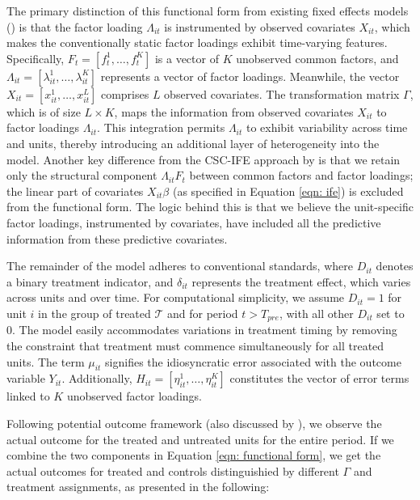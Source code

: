 \documentclass[12pt]{article}
\begin{document}
The primary distinction of this functional form from existing fixed effects models (\cite{gobillon2016regional, chan2016policy}) is that the factor loading $\Lambda_{it}$ is instrumented by observed covariates $X_{it}$, which makes the conventionally static factor loadings exhibit time-varying features. Specifically, $F_t = [f_t^1, \ldots, f_t^K]$ is a vector of $K$ unobserved common factors, and $\Lambda_{it} = [\lambda_{it}^1, \ldots, \lambda_{it}^K]$ represents a vector of factor loadings. Meanwhile, the vector $X_{it} = [x_{it}^1, \ldots, x_{it}^L]$ comprises $L$ observed covariates. The transformation matrix $\Gamma$, which is of size $L \times K$, maps the information from observed covariates $X_{it}$ to factor loadings $\Lambda_{it}$. This integration permits $\Lambda_{it}$ to exhibit variability across time and units, thereby introducing an additional layer of heterogeneity into the model. Another key difference from the CSC-IFE approach by \cite{xu2017generalized} is that we retain only the structural component $\Lambda_{it} F_t$ between common factors and factor loadings; the linear part of covariates $X_{it}\beta$ (as specified in Equation \ref{eqn: ife}) is excluded from the functional form. The logic behind this is that we believe the unit-specific factor loadings, instrumented by covariates, have included all the predictive information from these predictive covariates.

The remainder of the model adheres to conventional standards, where $D_{it}$ denotes a binary treatment indicator, and $\delta_{it}$ represents the treatment effect, which varies across units and over time. For computational simplicity, we assume $D_{it} = 1$ for unit $i$ in the group of treated $\mathcal{T}$ and for period $t > T_{pre}$, with all other $D_{it}$ set to $0$. The model easily accommodates variations in treatment timing by removing the constraint that treatment must commence simultaneously for all treated units. The term $\mu_{it}$ signifies the idiosyncratic error associated with the outcome variable $Y_{it}$. Additionally, $H_{it} = [\eta_{it}^1, \ldots, \eta_{it}^K]$ constitutes the vector of error terms linked to $K$ unobserved factor loadings.


Following \cite{splawa1990application} potential outcome framework (also discussed by \cite{rubin1974estimating, rubin2005causal}), we observe the actual outcome for the treated and untreated units for the entire period. If we combine the two components in Equation \ref{eqn: functional form}, we get the actual outcomes for treated and controls distinguishied by different $\Gamma$ and treatment assignments, as presented in the following:
\end{document}
